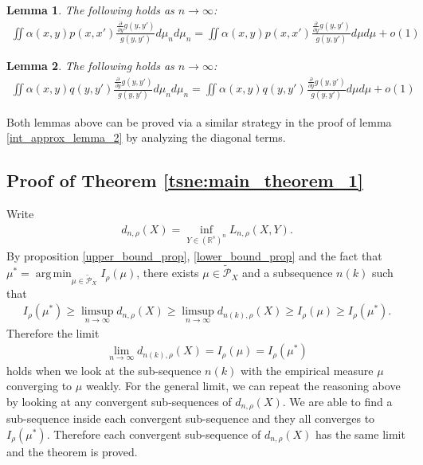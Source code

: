 \documentclass[10pt]{article}
\def\bbox{\quad\hbox{\vrule \vbox{\hrule \vskip2pt \hbox{\hskip2pt
\vbox{\hsize=1pt}\hskip2pt} \vskip2pt\hrule}\vrule}}
\def\qed{\hfill\break\rightline{$\bbox$}}
\DeclareMathOperator*{\argmin}{arg\,min}
\newtheorem{lemma}{\bf Lemma}
\newenvironment{Proof of lemma}{\noindent{\bf Proof of Lemma}}{\hfill$\Box$\newline}
\newenvironment{Proof of claim}{\noindent{\bf Proof of claim}}{\hfill$\Box$\newline}
\newenvironment{Proof of theorem}{\noindent{\bf Proof of Theorem}}{\hfill\scriptsize{$\Box$}\newline}
\newenvironment{Proof of theorems}{\noindent{\bf Proof of Theorems}}{\hfill$\Box$\newline}
\newenvironment{Proof of proposition}{\noindent{\bf Proof of Proposition}}{\hfill$\Box$\newline}
\newenvironment{Proof of propositions}{\noindent{\bf Proof of Propositions}}{\hfill$\Box$\newline}
\newenvironment{Proof of exercise}{\noindent{\it Proof of Exercise:}}{\hfill$\Box$}
\numberwithin{equation}{section}
\begin{document}
\begin{lemma} \label{appendix_lemma_1}
    The following holds as $n \to \infty$:
    \begin{align}
        \iint \alpha(x,y)p(x,x') \frac{\frac{\partial}{\partial y}g(y,y')}{g(y,y')} d\mu_n d\mu_n = \iint \alpha(x,y)p(x,x') \frac{\frac{\partial}{\partial y}g(y,y')}{g(y,y')} d\mu d\mu + o(1)
    \end{align}
\end{lemma}
\begin{lemma} \label{appendix_lemma_2}
    The following holds as $n \to \infty$:
    \begin{align}
        \iint \alpha(x,y)q(y,y') \frac{\frac{\partial}{\partial y}g(y,y')}{g(y,y')} d\mu_n d\mu_n = \iint \alpha(x,y)q(y,y') \frac{\frac{\partial}{\partial y}g(y,y')}{g(y,y')} d\mu d\mu + o(1)
    \end{align}
\end{lemma}
Both lemmas above can be proved via a similar strategy in the proof of lemma \ref{int_approx_lemma_2} by analyzing the diagonal terms.
\subsection{Proof of Theorem \ref{tsne:main_theorem_1}} \label{tsne:sec:main_theorem_1}
Write
\begin{align}
    d_{n,\rho}(X) = \inf_{Y \in (\mathbb{R}^s)^n}L_{n,\rho}(X,Y).
\end{align}
By proposition \ref{upper_bound_prop}, \ref{lower_bound_prop} and the fact that $\mu^* = \argmin_{\mu \in \tilde{\mathcal{P}}_X} I_{\rho}(\mu)$, there exists $\mu \in \tilde{\mathcal{P}}_X$ and a subsequence $n(k)$ such that
\begin{align}
    I_{\rho}(\mu^*) \geq \limsup_{n \to \infty} d_{n,\rho}(X) \geq \limsup_{n \to \infty} d_{n(k),\rho}(X) \geq I_{\rho}(\mu) \geq I_{\rho}(\mu^*).
\end{align}
Therefore the limit
\begin{align}
    \lim_{n \to \infty} d_{n(k),\rho}(X) = I_{\rho}(\mu) = I_{\rho}(\mu^*)
\end{align}
holds when we look at the sub-sequence $n(k)$ with the empirical measure $\mu$ converging to $\mu$ weakly. For the general limit, we can repeat the reasoning above by looking at any convergent sub-sequences of $d_{n,\rho}(X)$. We are able to find a sub-sequence inside each convergent sub-sequence and they all converges to $I_{\rho}(\mu^*)$. Therefore each convergent sub-sequence of $d_{n,\rho}(X)$ has the same limit and the theorem is proved. \qed
\end{document}
